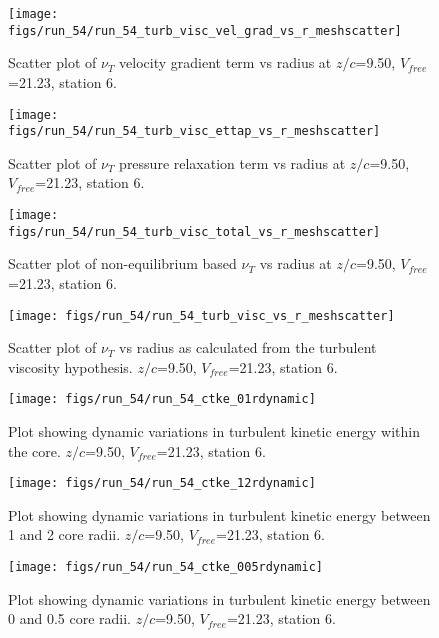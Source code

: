 \begin{figure}[H]
\centering
\texttt{[image: figs/run\_54/run\_54\_turb\_visc\_vel\_grad\_vs\_r\_meshscatter]}
\caption{Scatter plot of $\nu_T$ velocity gradient term vs radius at $z/c$=9.50, $V_{free}$=21.23, station 6.}
\end{figure}


\begin{figure}[H]
\centering
\texttt{[image: figs/run\_54/run\_54\_turb\_visc\_ettap\_vs\_r\_meshscatter]}
\caption{Scatter plot of $\nu_T$ pressure relaxation term vs radius at $z/c$=9.50, $V_{free}$=21.23, station 6.}
\end{figure}


\begin{figure}[H]
\centering
\texttt{[image: figs/run\_54/run\_54\_turb\_visc\_total\_vs\_r\_meshscatter]}
\caption{Scatter plot of non-equilibrium based $\nu_T$ vs radius at $z/c$=9.50, $V_{free}$=21.23, station 6.}
\end{figure}


\begin{figure}[H]
\centering
\texttt{[image: figs/run\_54/run\_54\_turb\_visc\_vs\_r\_meshscatter]}
\caption{Scatter plot of $\nu_T$ vs radius as calculated from the turbulent viscosity hypothesis. $z/c$=9.50, $V_{free}$=21.23, station 6.}
\end{figure}


\begin{figure}[H]
\centering
\texttt{[image: figs/run\_54/run\_54\_ctke\_01rdynamic]}
\caption{Plot showing dynamic variations in turbulent kinetic energy within the core. $z/c$=9.50, $V_{free}$=21.23, station 6.}
\end{figure}


\begin{figure}[H]
\centering
\texttt{[image: figs/run\_54/run\_54\_ctke\_12rdynamic]}
\caption{Plot showing dynamic variations in turbulent kinetic energy between 1 and 2 core radii. $z/c$=9.50, $V_{free}$=21.23, station 6.}
\end{figure}


\begin{figure}[H]
\centering
\texttt{[image: figs/run\_54/run\_54\_ctke\_005rdynamic]}
\caption{Plot showing dynamic variations in turbulent kinetic energy between 0 and 0.5 core radii. $z/c$=9.50, $V_{free}$=21.23, station 6.}
\end{figure}


